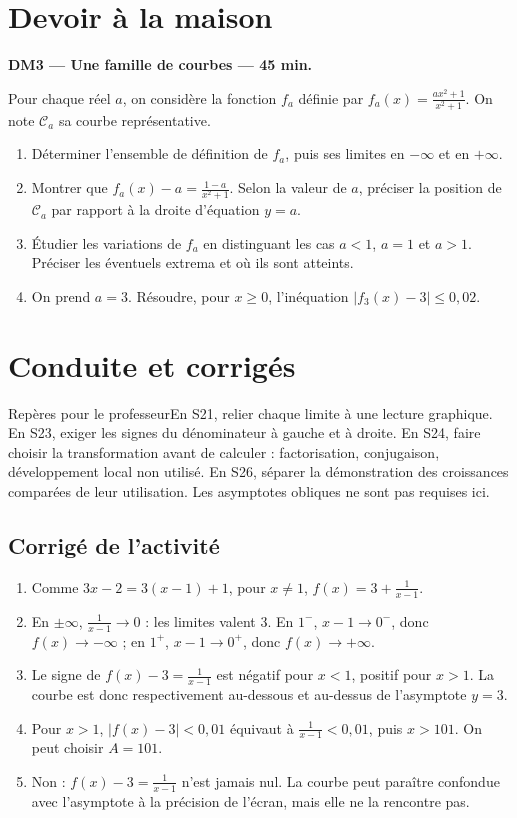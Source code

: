 \section{Devoir à la maison}\textbf{DM3 --- Une famille de courbes --- 45 min.}\par Pour chaque réel $a$, on considère la fonction $f_a$ définie par $f_a(x)=\frac{ax^2+1}{x^2+1}$. On note $\mathcal C_a$ sa courbe représentative.
\begin{enumerate}\item Déterminer l'ensemble de définition de $f_a$, puis ses limites en $-\infty$ et en $+\infty$.
\item Montrer que $f_a(x)-a=\frac{1-a}{x^2+1}$. Selon la valeur de $a$, préciser la position de $\mathcal C_a$ par rapport à la droite d'équation $y=a$.
\item Étudier les variations de $f_a$ en distinguant les cas $a<1$, $a=1$ et $a>1$. Préciser les éventuels extrema et où ils sont atteints.
\item On prend $a=3$. Résoudre, pour $x\ge0$, l'inéquation $|f_3(x)-3|\le0{,}02$.\end{enumerate}

\ifprof\clearpage\section{Conduite et corrigés}\begin{profbox}{Repères pour le professeur}En S21, relier chaque limite à une lecture graphique. En S23, exiger les signes du dénominateur à gauche et à droite. En S24, faire choisir la transformation avant de calculer : factorisation, conjugaison, développement local non utilisé. En S26, séparer la démonstration des croissances comparées de leur utilisation. Les asymptotes obliques ne sont pas requises ici.\end{profbox}

\subsection{Corrigé de l'activité}\begin{enumerate}
\item Comme $3x-2=3(x-1)+1$, pour $x\ne1$, $f(x)=3+\frac{1}{x-1}$.
\item En $\pm\infty$, $\frac{1}{x-1}\to0$ : les limites valent $3$. En $1^-$, $x-1\to0^-$, donc $f(x)\to-\infty$ ; en $1^+$, $x-1\to0^+$, donc $f(x)\to+\infty$.
\item Le signe de $f(x)-3=\frac{1}{x-1}$ est négatif pour $x<1$, positif pour $x>1$. La courbe est donc respectivement au-dessous et au-dessus de l'asymptote $y=3$.
\item Pour $x>1$, $|f(x)-3|<0{,}01$ équivaut à $\frac{1}{x-1}<0{,}01$, puis $x>101$. On peut choisir $A=101$.
\item Non : $f(x)-3=\frac{1}{x-1}$ n'est jamais nul. La courbe peut paraître confondue avec l'asymptote à la précision de l'écran, mais elle ne la rencontre pas.
\end{enumerate}

